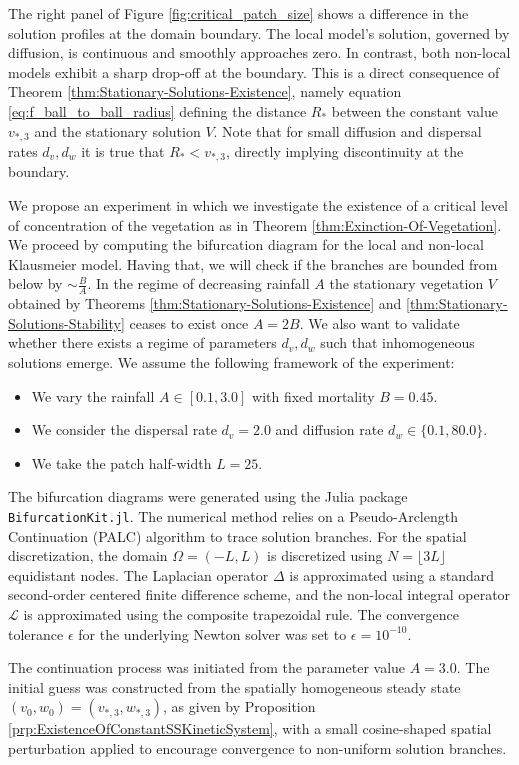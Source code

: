 \documentclass[review,onefignum,onetabnum]{SIAM-styles/siamart171218}
\begin{document}
\begin{con}
The right panel of Figure \ref{fig:critical_patch_size} shows a difference in the solution profiles at the domain boundary. The local model's solution, governed by diffusion, is continuous and smoothly approaches zero. In contrast, both non-local models exhibit a sharp drop-off at the boundary. This is a direct consequence of Theorem \ref{thm:Stationary-Solutions-Existence}, namely equation \eqref{eq:f_ball_to_ball_radius} defining the distance $R_*$ between the constant value $v_{*, 3}$ and the stationary solution $V$. Note that for small diffusion and dispersal rates $d_v, d_w$ it is true that $R_* < v_{*, 3}$, directly implying discontinuity at the boundary.
\end{con}

\begin{expe}
    We propose an experiment in which we investigate the existence of a critical level of concentration of the vegetation as in Theorem \ref{thm:Exinction-Of-Vegetation}. We proceed by computing the bifurcation diagram for the local and non-local Klausmeier model. Having that, we will check if the branches are bounded from below by $\sim\frac{B}{A}$. In the regime of decreasing rainfall $A$ the stationary vegetation $V$ obtained by Theorems \ref{thm:Stationary-Solutions-Existence} and \ref{thm:Stationary-Solutions-Stability} ceases to exist once $A = 2B$. We also want to validate whether there exists a regime of parameters $d_v, d_w$ such that inhomogeneous solutions emerge. We assume the following framework of the experiment:
    \begin{itemize}
        \item We vary the rainfall $A \in [0.1, 3.0]$ with fixed mortality $B = 0.45$.
        \item We consider the dispersal rate $d_v = 2.0$ and diffusion rate $d_w \in \{0.1, 80.0\}$.
        \item We take the patch half-width $L = 25$.
    \end{itemize}
    The bifurcation diagrams were generated using the Julia package \texttt{BifurcationKit.jl}. The numerical method relies on a Pseudo-Arclength Continuation (PALC) algorithm to trace solution branches. For the spatial discretization, the domain $\Omega = (-L, L)$ is discretized using $N = \lfloor 3L \rfloor$ equidistant nodes. The Laplacian operator $\Delta$ is approximated using a standard second-order centered finite difference scheme, and the non-local integral operator $\mathcal{L}$ is approximated using the composite trapezoidal rule. The convergence tolerance $\epsilon$ for the underlying Newton solver was set to $\epsilon = 10^{-10}$.

    The continuation process was initiated from the parameter value $A = 3.0$. The initial guess was constructed from the spatially homogeneous steady state $(v_0, w_0) = (v_{*, 3}, w_{*, 3})$, as given by Proposition \ref{prp:ExistenceOfConstantSSKineticSystem}, with a small cosine-shaped spatial perturbation applied to encourage convergence to non-uniform solution branches.
\end{expe}
\end{document}
